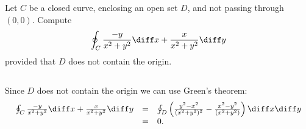 \begin{frame}
\begin{example}
\begin{columns}

Let $C$ be a closed curve, enclosing an open set $D$, and not passing through $(0,0)$. Compute 
\[
\oint_C \frac{-y}{x^2+y^2}\diff x + \frac{x}{x^2+y^2}\diff y
\]
provided that $D$ does not contain the origin.
\end{columns}
Since $D$ does not contain the origin we can use Green's theorem:
\[
\begin{array}{rcl}
\oint_C \frac{-y}{x^2+y^2}\diff x + \frac{x}{x^2+y^2}\diff y&=& \oint_D\left( \frac{y^2-x^2}{(x^2+y^2)^2}-\frac{x^2-y^2}{(x^2+y^2)}\right)\diff x \diff y\\
&=&0.
\end{array}
\]
\end{example}
\end{frame}